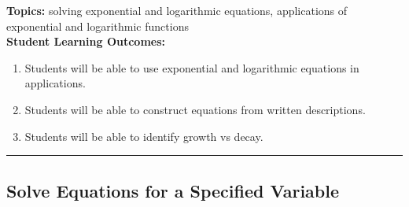 

\noindent \textbf{Topics:}  solving exponential and logarithmic equations, applications of exponential and logarithmic functions\\

\noindent \textbf{Student Learning Outcomes:}
\begin{enumerate}
\item Students will be able to use exponential and logarithmic equations in applications.
\item Students will be able to construct equations from written descriptions.
\item Students will be able to identify growth vs decay.
\end{enumerate}

\hrule 

\bigskip

\subsection{Solve Equations for a Specified Variable}



